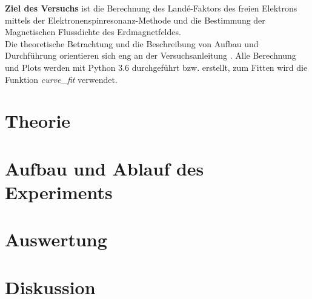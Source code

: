 \documentclass[a4,11pt]{article}
\begin{document}



\tableofcontents
\clearpage

\textbf{Ziel des Versuchs} ist die Berechnung des Landé-Faktors des freien Elektrons mittels der Elektronenspinresonanz-Methode und die Bestimmung der Magnetischen Flussdichte des Erdmagnetfeldes. \\
Die theoretische Betrachtung und die Beschreibung von Aufbau und Durchführung orientieren sich eng an der Versuchsanleitung \cite{V28}. Alle Berechnung und Plots werden mit Python 3.6 durchgeführt bzw. erstellt, zum Fitten wird die Funktion \textit{curve\_fit} verwendet.


\section{Theorie}

\clearpage


\section{Aufbau und Ablauf des Experiments}

\clearpage


\section{Auswertung}

\clearpage


\section{Diskussion}


\clearpage
\listoftodos
\listoffigures
\listoftables
\clearpage
\nocite{Griffiths}
\printbibliography[title = Literaturverzeichnis]
\end{document}
